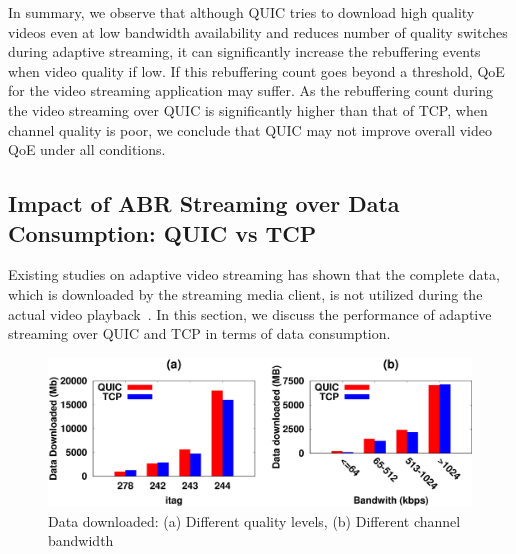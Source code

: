 In summary, we observe that although QUIC tries to download high quality videos even at low bandwidth availability and reduces number of quality switches during adaptive streaming, it can significantly increase the rebuffering events when video quality if low. 
If this rebuffering count goes beyond a threshold, QoE for the video streaming application may suffer. 
As the rebuffering count during the video streaming over QUIC is significantly higher than that of TCP, when channel quality is poor, we conclude that QUIC may not improve overall video QoE under all conditions. 

%

\subsection{Impact of ABR Streaming over Data Consumption: QUIC vs TCP}

Existing studies on adaptive video streaming has shown that the complete data, which is downloaded by the streaming media client, is not utilized during the actual video playback~\cite{krishnappa2013dashing}. 
In this section, we discuss the performance of adaptive streaming over QUIC and TCP in terms of data consumption. 

\begin{figure}[!t]
	\captionsetup[subfigure]{}
	\begin{center}
        \includegraphics[width=0.9\linewidth]{img/plotdata/CDF/downloaded/data_dowloaded_itag_bw}
		\caption{\label{fig:data_download}Data downloaded: (a) Different quality levels, (b) Different channel bandwidth}
	\end{center}
\end{figure}


